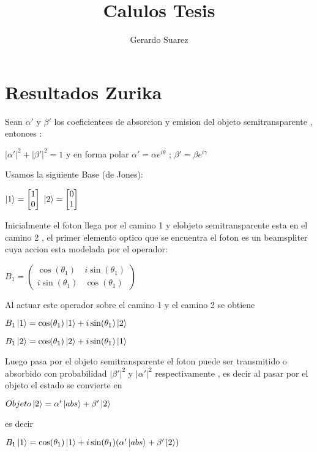 \documentclass[11pt]{article}
\title{\textbf{Calulos Tesis}}
\author{Gerardo Suarez
}
\date{}
\begin{document}
\maketitle

\section{Resultados Zurika}

Sean $\alpha'$ y $\beta'$ los coeficientees de absorcion y emision del objeto semitransparente , entonces :

$|\alpha'|^2 + |\beta'|^2 = 1$  y en forma polar   $\alpha'=\alpha e^{i \theta}$ ; $\beta'=\beta e^{i \gamma}$

Usamos la siguiente Base (de Jones):

$\ket{1}=\begin{bmatrix} 1 \\0\end{bmatrix} $   \hspace{5 cm}   $\ket{2}=\begin{bmatrix} 0\\1\end{bmatrix}$ 

Inicialmente el foton llega por el camino 1 y elobjeto semitransparente esta en el camino 2 , el primer elemento optico que se encuentra el foton es un beamspliter cuya accion esta modelada por el operador:

$B_{1}=\begin{pmatrix} \cos(\theta_{1}) & i \sin(\theta_{1}) \\ i \sin(\theta_{1}) & \cos(\theta_{1}) \end{pmatrix}$

Al actuar este operador sobre el camino 1 y el camino 2 se obtiene 

$B_{1}\ket{1}=\cos(\theta_{1})\ket{1}+i\sin(\theta_{1})\ket{2}$

$B_{1}\ket{2}=\cos(\theta_{1})\ket{2}+i\sin(\theta_{1})\ket{1}$

Luego pasa por el objeto semitransparente el foton puede ser transmitido o absorbido con probabilidad $|\beta'|^2$ y $|\alpha'|^2$ respectivamente , es decir al pasar por el objeto el estado se convierte en 

$Objeto\ket{2}=\alpha' \ket{abs} +\beta' \ket{2} $

es decir 

$B_{1}\ket{1}=\cos(\theta_{1})\ket{1}+i\sin(\theta_{1})(\alpha' \ket{abs} +\beta' \ket{2} )$
\end{document}
